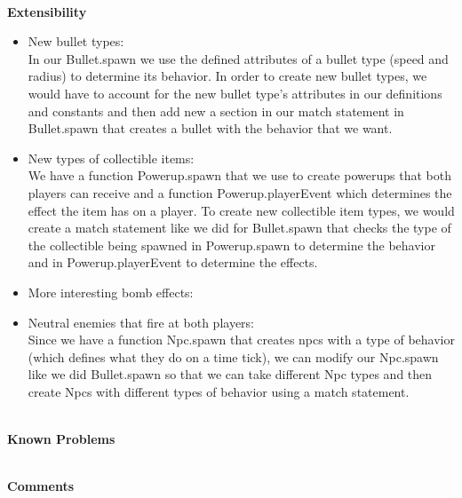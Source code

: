\documentclass{article}[12pt]
\begin{document}
\hspace*{\fill}\\[\baselineskip]
\Large{\textbf{Extensibility}}
\hspace*{\fill}
\begin{itemize}
	\item New bullet types: \\
					In our Bullet.spawn we use the defined attributes of a bullet type (speed and radius) to determine its behavior. In order to create new bullet types, we would have to account for the new bullet type's attributes in our definitions and constants and then add new a section in our match statement in Bullet.spawn that creates a bullet with the behavior that we want.
	\item New types of collectible items: \\
					We have a function Powerup.spawn that we use to create powerups that both players can receive and a function Powerup.playerEvent which determines the effect the item has on a player. To create new collectible item types, we would create a match statement like we did for Bullet.spawn that checks the type of the collectible being spawned in Powerup.spawn to determine the behavior and in Powerup.playerEvent to determine the effects.
	\item More interesting bomb effects: \\
	\item Neutral enemies that fire at both players: \\
					Since we have a function Npc.spawn that creates npcs with a type of behavior (which defines what they do on a time tick), we can modify our Npc.spawn like we did Bullet.spawn so that we can take different Npc types and then create Npcs with different types of behavior using a match statement.
\end{itemize}
\hspace*{\fill}\\
\Large{\textbf{Known Problems}}
\hspace*{\fill}

\hspace*{\fill}\\[\baselineskip]
\Large{\textbf{Comments}}
\hspace*{\fill}
\end{document}

